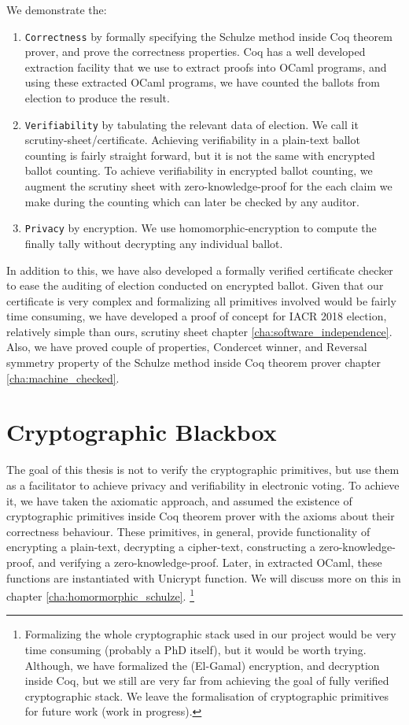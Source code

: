 We demonstrate the:
\begin{enumerate}
 \item \texttt{Correctness} by formally specifying the Schulze method  inside 
 Coq theorem prover, and prove the correctness properties. 
 Coq has a well developed extraction facility that 
 we use to extract proofs into OCaml programs, and using these extracted OCaml programs, we 
 have counted the ballots from election to produce the result. 
 \item \texttt{Verifiability} by tabulating the relevant data of election. We call it scrutiny-sheet/certificate. 
   Achieving verifiability in a plain-text ballot counting is fairly straight forward, but it is not 
   the same with encrypted ballot counting.  To achieve verifiability in encrypted ballot counting, 
   we augment the scrutiny sheet with zero-knowledge-proof for the each claim we make during the 
   counting which can  later be checked by any auditor.  
 \item \texttt{Privacy} by encryption. We use homomorphic-encryption to compute the 
  finally tally without decrypting any individual ballot. 
\end{enumerate}


In addition to this, we have also developed a formally verified certificate checker to ease the 
auditing of election conducted on encrypted ballot.  Given that our certificate is very complex 
and formalizing all primitives involved would be fairly time consuming, we have developed a 
proof of concept for IACR 2018 election, relatively simple than ours, scrutiny sheet
chapter \ref{cha:software_independence}. 
Also, we have proved couple of properties, Condercet winner, and Reversal symmetry property 
of the Schulze method inside Coq theorem prover chapter \ref{cha:machine_checked}.

\section{Cryptographic Blackbox}
The goal of this thesis is not to verify the cryptographic primitives, but use them as a 
facilitator to achieve privacy and verifiability in electronic voting. To achieve it, we have 
taken the axiomatic approach, and assumed the existence of cryptographic primitives 
inside Coq theorem prover with the 
axioms about their correctness behaviour. These primitives, in general, provide functionality 
of encrypting a plain-text, decrypting a cipher-text, constructing a zero-knowledge-proof, 
and verifying a zero-knowledge-proof. Later, in extracted OCaml, these functions are instantiated 
with Unicrypt\citep{LocherH14} function.  We will discuss more on this in chapter
\ref{cha:homormorphic_schulze}.
\footnote{Formalizing the whole cryptographic stack used in our 
project would be very time consuming (probably a PhD itself), but it would be worth trying. 
Although, we have formalized the (El-Gamal) encryption, and decryption inside Coq, but we still 
are very far from achieving the goal of fully verified cryptographic stack.  We leave the formalisation 
of cryptographic primitives for future work (work in progress).}



